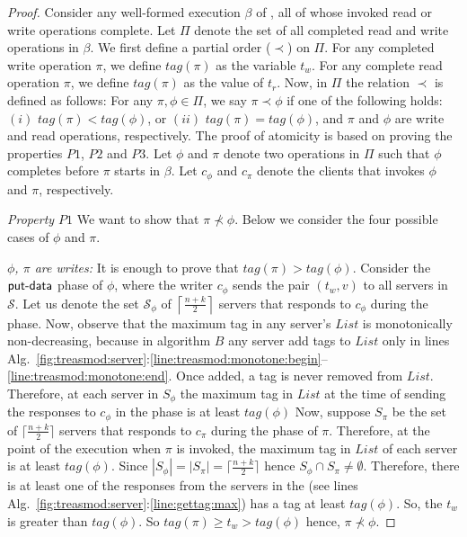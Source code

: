 			\begin{proof}
Consider any well-formed execution $\beta$ of \treasmod, all of whose invoked read or write operations complete. Let $\Pi$ denote the set of all completed read and write operations in $\beta$. We first define a partial order ($\prec$) on $\Pi$. 
For any completed write operation $\pi$, we define $tag(\pi)$ as the variable  $t_w$. For any complete read operation $\pi$, we define $tag(\pi)$ as the value of $t_r$. 
Now, in $\Pi$ the relation $\prec$ is defined as follows: For any $\pi, \phi \in \Pi$, we say $\pi \prec \phi$  if 
one of the following holds: $(i)$  $tag(\pi)  < tag(\phi)$, or $(ii)$ $tag(\pi) = tag(\phi)$, and  $\pi$ and $\phi$ are write and read 
operations, respectively. The proof of atomicity is based on proving 				
 the properties $P1$, $P2$ and $P3$. Let $\phi$ and $\pi$ denote two operations in $\Pi$ such that $\phi$ completes before $\pi$ starts in $\beta$.  Let  $c_{\phi}$ and $c_{\pi}$ denote the clients that invokes $\phi$ and $\pi$, respectively. 

\emph{Property $P1$} We want to show that $\pi \not\prec \phi$. Below we consider the four possible cases of $\phi$ and $\pi$.

\emph{ $\phi$, $\pi$ are writes:} It is enough to prove that $tag(\pi) > tag(\phi)$. Consider the $\act{put-data}$ phase of $\phi$, where the writer $c_{\phi}$  sends the pair $(t_w, v)$ to all 
servers in $\mathcal{S}$. Let us denote the  set $\mathcal{S}_{\phi}$ of $\left\lceil \frac{n+k}{2} \right\rceil$ servers  that responds to $c_{\phi}$ during the  phase.  
Now, observe that the maximum tag in any server's $List$ is monotonically non-decreasing, because in algorithm $B$  
any server add tags to  $List$  only in lines 
Alg.~\ref{fig:treasmod:server}:\ref{line:treasmod:monotone:begin}--\ref{line:treasmod:monotone:end}.  Once added, a tag is never removed from $List$.
Therefore, at  each server in $S_{\phi}$ the maximum tag in $List$ at the time of 
sending the responses to $c_{\phi}$ in the   phase is at least $tag(\phi)$ 
 Now, suppose $S_{\pi}$ be 
the set of $\lceil \frac{n+k}{2} \rceil$ servers that responds to $c_{\pi}$ during the  phase of $\pi$. 
 Therefore, at the point of the execution when $\pi$ is invoked, the maximum
tag in  $List$ of each server is at least $tag(\phi)$. Since $|S_{\phi}| = | S_{\pi}| = \lceil \frac{n+k}{2} \rceil$  hence 
$S_{\phi} \cap S_{\pi} \neq \emptyset $. Therefore, there is at least one of the  responses from the servers in the 
(see lines Alg.~\ref{fig:treasmod:server}:\ref{line:gettag:max}) has a tag at least $tag(\phi)$. So, the $t_w$ is greater than $tag(\phi)$. So $tag(\pi) \geq t_w > tag(\phi)$ hence, $\pi \not\prec \phi$.
 

\end{proof}

